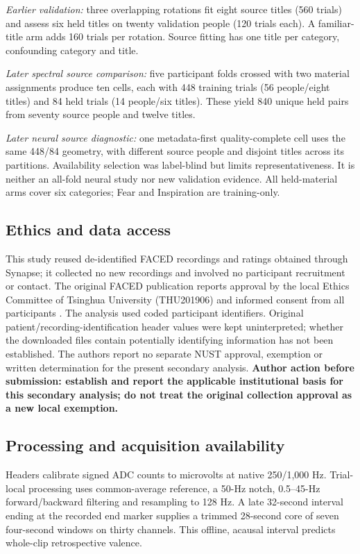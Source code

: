 \documentclass[12pt,a4paper]{article}
\begin{document}
\textit{Earlier validation:} three overlapping rotations fit eight source titles (560 trials) and assess six held titles on twenty validation people (120 trials each). A familiar-title arm adds 160 trials per rotation. Source fitting has one title per category, confounding category and title.

\textit{Later spectral source comparison:} five participant folds crossed with two material assignments produce ten cells, each with 448 training trials (56 people/eight titles) and 84 held trials (14 people/six titles). These yield 840 unique held pairs from seventy source people and twelve titles.

\textit{Later neural source diagnostic:} one metadata-first quality-complete cell uses the same 448/84 geometry, with different source people and disjoint titles across its partitions. Availability selection was label-blind but limits representativeness. It is neither an all-fold neural study nor new validation evidence. All held-material arms cover six categories; Fear and Inspiration are training-only.

\subsection{Ethics and data access}
This study reused de-identified FACED recordings and ratings obtained through Synapse; it collected no new recordings and involved no participant recruitment or contact. The original FACED publication reports approval by the local Ethics Committee of Tsinghua University (THU201906) and informed consent from all participants \cite{chen2023faced}. The analysis used coded participant identifiers. Original patient/recording-identification header values were kept uninterpreted; whether the downloaded files contain potentially identifying information has not been established. The authors report no separate NUST approval, exemption or written determination for the present secondary analysis. \textbf{Author action before submission: establish and report the applicable institutional basis for this secondary analysis; do not treat the original collection approval as a new local exemption.}

\subsection{Processing and acquisition availability}
Headers calibrate signed ADC counts to microvolts at native 250/1,000 Hz. Trial-local processing uses common-average reference, a 50-Hz notch, 0.5--45-Hz forward/backward filtering and resampling to 128 Hz. A late 32-second interval ending at the recorded end marker supplies a trimmed 28-second core of seven four-second windows on thirty channels. This offline, acausal interval predicts whole-clip retrospective valence.
\end{document}
